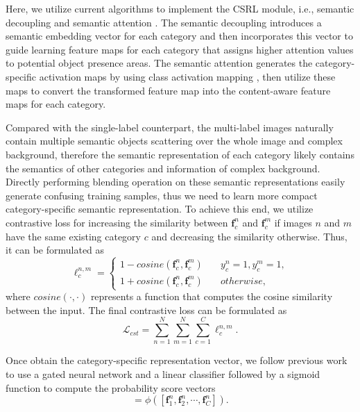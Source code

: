\documentclass[lettersize,journal]{IEEEtran}
\begin{document}
Here, we utilize current algorithms to implement the CSRL module, i.e., semantic decoupling \cite{Chen2019SSGRL} and semantic attention \cite{Ye2020ADD-GCN}. The semantic decoupling \cite{Chen2019SSGRL} introduces a semantic embedding vector for each category and then incorporates this vector to guide learning feature maps for each category that assigns higher attention values to potential object presence areas. The semantic attention \cite{Ye2020ADD-GCN} generates the category-specific activation maps by using class activation mapping \cite{Zhou2016CAM}, then utilize these maps to convert the transformed feature map into the content-aware feature maps for each category.

Compared with the single-label counterpart, the multi-label images naturally contain multiple semantic objects scattering over the whole image and complex background, therefore the semantic representation of each category likely contains the semantics of other categories and information of complex background. Directly performing blending operation on these semantic representations easily generate confusing training samples, thus we need to learn more compact category-specific semantic representation. To achieve this end, we utilize contrastive loss for increasing the similarity between $\textbf{f}^n_c$ and $\textbf{f}^m_c$ if images $n$ and $m$ have the same existing category $c$ and decreasing the similarity otherwise. Thus, it can be formulated as
\begin{equation}
\ell^{n,m}_c=
    \begin{cases}
         1-cosine(\textbf{f}^n_c, \textbf{f}^m_c) \quad & y^n_c=1,y^m_c=1,\\
         1+cosine(\textbf{f}^n_c, \textbf{f}^m_c) \quad & otherwise,
    \end{cases}
\end{equation}
where $cosine(\cdot, \cdot)$ represents a function that computes the cosine similarity between the input. The final contrastive loss can be formulated as 
\begin{equation}
\mathcal{L}_{cst}=\sum^{N}_{n=1} \sum^{N}_{m=1} \sum^{C}_{c=1} \ell^{n,m}_c.
\end{equation}

Once obtain the category-specific representation vector, we follow previous work \cite{Chen2019SSGRL,Chen2022KGGR, Ye2020ADD-GCN, Chen2021Cross} to use a gated neural network and a linear classifier followed by a sigmoid function to compute the probability score vectors
\begin{equation}
  [s^n_1, s^n_2, \cdots, s^n_C]=\phi([\textbf{f}^n_1, \textbf{f}^n_2, \cdots, \textbf{f}^n_C]).
\end{equation}
\end{document}
